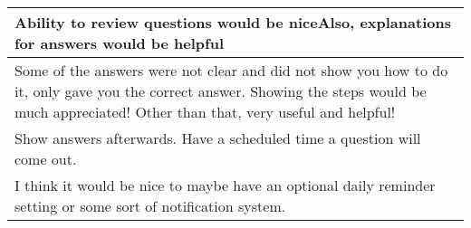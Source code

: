 \begin{longtable}{|p{1\linewidth}|}
		\hline
		Ability to review questions would be niceAlso, explanations for answers would be helpful                                                                                                                                                                                                                                                                                                                                                                                                                                                                                                                                                                                                         \\
		\hline
		Some of the answers were not clear and did not show you how to do it, only gave you the correct answer. Showing the steps would be much appreciated! Other than that, very useful and helpful!                                                                                                                                                                                                                                                                                                                                                                                                                                                                                                   \\
		\hline
		Show answers afterwards. Have a scheduled time a question will come out.                                                                                                                                                                                                                                                                                                                                                                                                                                                                                                                                                                                                                         \\
		\hline
		I think it would be nice to maybe have an optional daily reminder setting or some sort of notification system.                                                                                                                                                                                                                                                                                                                                                                                                                                                                                                                                                                                   \\

\end{longtable}
